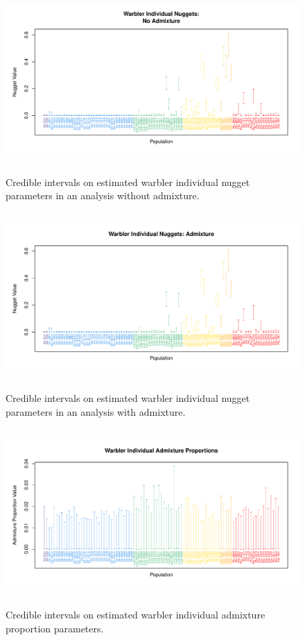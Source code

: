 \documentclass[12pt]{article}
\begin{document}
\begin{figure}
\centering
	{\includegraphics[width=5in,height=2.5in]{figs/warblers/warb_ind_NoAd_nugget.pdf}}
	\caption{Credible intervals on estimated warbler individual nugget parameters in an analysis without admixture.}\label{sfig:warb_ind_noad_nugg}
\end{figure}


\begin{figure}
\centering
	{\includegraphics[width=5in,height=2.5in]{figs/warblers/warb_ind_Ad_nugget.pdf}}
	\caption{Credible intervals on estimated warbler individual nugget parameters in an analysis with admixture.}\label{sfig:warb_ind_ad_nugg}
\end{figure}

\begin{figure}
\centering
	{\includegraphics[width=5in,height=2.5in]{figs/warblers/warb_ind_adprop.pdf}}
	\caption{Credible intervals on estimated warbler individual admixture proportion parameters.}\label{sfig:warb_ind_adprops}
\end{figure}
\end{document}
